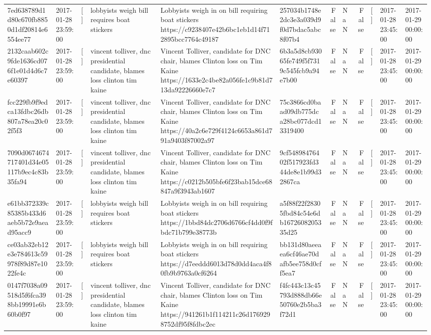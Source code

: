 \begin{tabular}{llllllrlrlll}
7ed638789d1d80c670fb8850d1df20814e6554ee77 & 2017-01-28 23:59:00 & [] & lobbyists weigh bill requires boat stickers & Lobbyists weigh in on bill requiring boat stickers https://c9238407e42b6bc1eb1d14f712895bcc7764c49187 & 257034b1748e2dc3e3a039d9f0d7bdac5abc8f07b4 & False & NaN & False & [] & 2017-01-28 23:45:00 & 2017-01-29 00:00:00 \\
2132caab602c9fde1636cd076f1e01d4d6c7e60397 & 2017-01-28 23:59:00 & [] & vincent tolliver, dnc presidential candidate, blames loss clinton tim kaine & Vincent Tolliver, candidate for DNC chair, blames Clinton loss on Tim Kaine https://1633e2c4be82a056fe1c9b81d713da92226660e7c7 & 6b3a5d8cb93065fe749f5f7319c545fcb9a94e7b00 & False & NaN & False & [] & 2017-01-28 23:45:00 & 2017-01-29 00:00:00 \\
fcc229fb9f9edca13fdbc26db807a78ea20c02f5f3 & 2017-01-28 23:59:00 & [] & vincent tolliver, dnc presidential candidate, blames loss clinton tim kaine & Vincent Tolliver, candidate for DNC chair, blames Clinton loss on Tim Kaine https://40a2c6e729f4124c6653a861d791a9403f87002a97 & 75c3866cd0baad09db775dca28bc077dcd13319400 & False & NaN & False & [] & 2017-01-28 23:45:00 & 2017-01-29 00:00:00 \\
7090d0674674717401d34e05117b9ec4c83b35fa94 & 2017-01-28 23:59:00 & [] & vincent tolliver, dnc presidential candidate, blames loss clinton tim kaine & Vincent Tolliver, candidate for DNC chair, blames Clinton loss on Tim Kaine https://c0212b505bfe6f23bab15dce68847a9f3943ab1607 & 9cf54898476402f517923fd344de8e1b99d32867ca & False & NaN & False & [] & 2017-01-28 23:45:00 & 2017-01-29 00:00:00 \\
e61bb372339c85385b433d6aeb5b72e9aead95acc9 & 2017-01-28 23:59:00 & [] & lobbyists weigh bill requires boat stickers & Lobbyists weigh in on bill requiring boat stickers https://1bbd84dc2706d6766cf4dd0f9fbdc71b799e38773b & a5f88f22f28305fbd84c54e6db1672608205335d25 & False & NaN & False & [] & 2017-01-28 23:45:00 & 2017-01-29 00:00:00 \\
ce03ab32eb12e3e784613c59978f89d87e1022fe4c & 2017-01-28 23:59:00 & [] & lobbyists weigh bill requires boat stickers & Lobbyists weigh in on bill requiring boat stickers https://d7eeddd6013d78d0dd4aca4f80fb9b9763a0cf6264 & bb131d80aeeaea6cf46ae70dafb5ee758d0cff5ea7 & False & NaN & False & [] & 2017-01-28 23:45:00 & 2017-01-29 00:00:00 \\
0147f7038a09518d5f6fca398bb19991e6b60b0f97 & 2017-01-28 23:59:00 & [] & vincent tolliver, dnc presidential candidate, blames loss clinton tim kaine & Vincent Tolliver, candidate for DNC chair, blames Clinton loss on Tim Kaine https://941261b1f114211c26d1769298752df95f8fdbc2ec & f4fc443c13c45793d888db66e50760e2b5ba3f72d1 & False & NaN & False & [] & 2017-01-28 23:45:00 & 2017-01-29 00:00:00 \\

\end{tabular}
